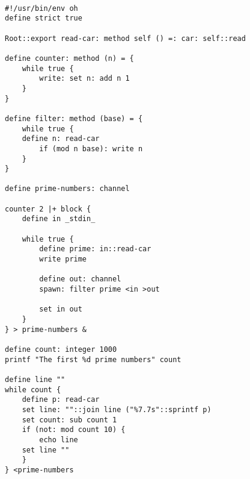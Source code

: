 \documentclass[12pt]{book}
\begin{document}
\begin{lstlisting}

#!/usr/bin/env oh
define strict true

Root::export read-car: method self () =: car: self::read

define counter: method (n) = {
    while true {
        write: set n: add n 1
    }
}

define filter: method (base) = {
    while true {
	define n: read-car
        if (mod n base): write n
    }
}

define prime-numbers: channel

counter 2 |+ block {
    define in _stdin_

    while true {
        define prime: in::read-car
        write prime

        define out: channel
        spawn: filter prime <in >out

        set in out
    }
} > prime-numbers &

define count: integer 1000
printf "The first %d prime numbers" count

define line ""
while count {
    define p: read-car
    set line: ""::join line ("%7.7s"::sprintf p)
    set count: sub count 1
    if (not: mod count 10) {
        echo line
	set line ""
    }
} <prime-numbers
\end{lstlisting}




\end{document}
